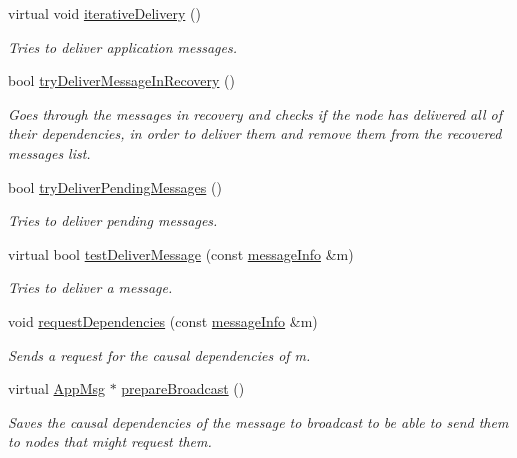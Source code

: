 \begin{DoxyCompactItemize}
virtual void \hyperlink{class_node_with_recovery_a9b61912f38b62452584dc80bf261ef4e}{iterative\+Delivery} ()
\begin{DoxyCompactList}\small\item\em Tries to deliver application messages. \end{DoxyCompactList}\item 
bool \hyperlink{class_node_with_recovery_a87a1ce8071c9c587b878636f79163e7e}{try\+Deliver\+Message\+In\+Recovery} ()
\begin{DoxyCompactList}\small\item\em Goes through the messages in recovery and checks if the node has delivered all of their dependencies, in order to deliver them and remove them from the recovered messages list. \end{DoxyCompactList}\item 
bool \hyperlink{class_node_with_recovery_a462d825601a3c85ee4ef95be673790f8}{try\+Deliver\+Pending\+Messages} ()
\begin{DoxyCompactList}\small\item\em Tries to deliver pending messages. \end{DoxyCompactList}\item 
virtual bool \hyperlink{class_node_with_recovery_aec147b3723b3dab00f9610453ba8daba}{test\+Deliver\+Message} (const \hyperlink{structures_8h_a7e7bdc1d2fff8a9436f2f352b2711ed6}{message\+Info} \&m)
\begin{DoxyCompactList}\small\item\em Tries to deliver a message. \end{DoxyCompactList}\item 
void \hyperlink{class_node_with_recovery_a8b16bbc948fddc744a55ac548348a988}{request\+Dependencies} (const \hyperlink{structures_8h_a7e7bdc1d2fff8a9436f2f352b2711ed6}{message\+Info} \&m)
\begin{DoxyCompactList}\small\item\em Sends a request for the causal dependencies of m. \end{DoxyCompactList}\item 
virtual \hyperlink{class_app_msg}{App\+Msg} $\ast$ \hyperlink{class_node_with_recovery_a33d8e8775fd69cb647b38a54b36e1ebe}{prepare\+Broadcast} ()
\begin{DoxyCompactList}\small\item\em Saves the causal dependencies of the message to broadcast to be able to send them to nodes that might request them. \end{DoxyCompactList}\end{DoxyCompactItemize}
